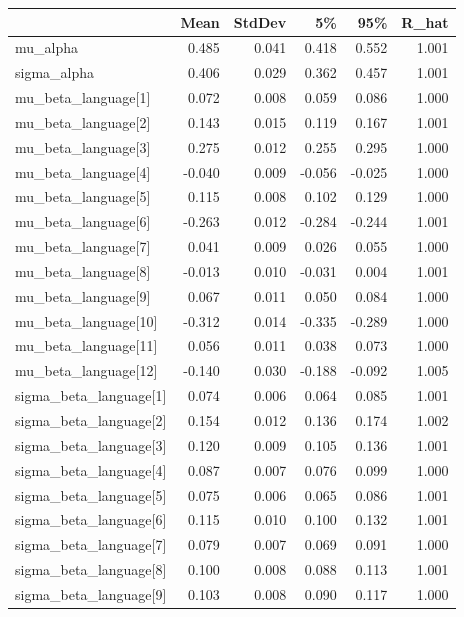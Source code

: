 \begin{tabular}{lrrrrr}
\toprule
 & Mean & StdDev & 5\% & 95\% & R\_hat \\
\midrule
mu\_alpha & 0.485 & 0.041 & 0.418 & 0.552 & 1.001 \\
sigma\_alpha & 0.406 & 0.029 & 0.362 & 0.457 & 1.001 \\
mu\_beta\_language[1] & 0.072 & 0.008 & 0.059 & 0.086 & 1.000 \\
mu\_beta\_language[2] & 0.143 & 0.015 & 0.119 & 0.167 & 1.001 \\
mu\_beta\_language[3] & 0.275 & 0.012 & 0.255 & 0.295 & 1.000 \\
mu\_beta\_language[4] & -0.040 & 0.009 & -0.056 & -0.025 & 1.000 \\
mu\_beta\_language[5] & 0.115 & 0.008 & 0.102 & 0.129 & 1.000 \\
mu\_beta\_language[6] & -0.263 & 0.012 & -0.284 & -0.244 & 1.001 \\
mu\_beta\_language[7] & 0.041 & 0.009 & 0.026 & 0.055 & 1.000 \\
mu\_beta\_language[8] & -0.013 & 0.010 & -0.031 & 0.004 & 1.001 \\
mu\_beta\_language[9] & 0.067 & 0.011 & 0.050 & 0.084 & 1.000 \\
mu\_beta\_language[10] & -0.312 & 0.014 & -0.335 & -0.289 & 1.000 \\
mu\_beta\_language[11] & 0.056 & 0.011 & 0.038 & 0.073 & 1.000 \\
mu\_beta\_language[12] & -0.140 & 0.030 & -0.188 & -0.092 & 1.005 \\
sigma\_beta\_language[1] & 0.074 & 0.006 & 0.064 & 0.085 & 1.001 \\
sigma\_beta\_language[2] & 0.154 & 0.012 & 0.136 & 0.174 & 1.002 \\
sigma\_beta\_language[3] & 0.120 & 0.009 & 0.105 & 0.136 & 1.001 \\
sigma\_beta\_language[4] & 0.087 & 0.007 & 0.076 & 0.099 & 1.000 \\
sigma\_beta\_language[5] & 0.075 & 0.006 & 0.065 & 0.086 & 1.001 \\
sigma\_beta\_language[6] & 0.115 & 0.010 & 0.100 & 0.132 & 1.001 \\
sigma\_beta\_language[7] & 0.079 & 0.007 & 0.069 & 0.091 & 1.000 \\
sigma\_beta\_language[8] & 0.100 & 0.008 & 0.088 & 0.113 & 1.001 \\
sigma\_beta\_language[9] & 0.103 & 0.008 & 0.090 & 0.117 & 1.000 \\

\end{tabular}
